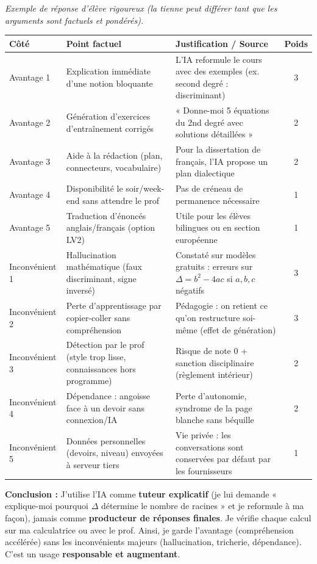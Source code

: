 \documentclass[11pt]{article}
\begin{document}
\begin{corrige}
\textit{Exemple de réponse d'élève rigoureux (la tienne peut différer tant que les arguments sont factuels et pondérés).}
\begin{center}
\begin{tabularx}{\linewidth}{|l|X|X|c|}
\hline
\textbf{Côté} & \textbf{Point factuel} & \textbf{Justification / Source} & \textbf{Poids} \\
\hline
Avantage 1 & Explication immédiate d'une notion bloquante & L'IA reformule le cours avec des exemples (ex. second degré : discriminant) & 3 \\
Avantage 2 & Génération d'exercices d'entraînement corrigés & « Donne-moi 5 équations du 2nd degré avec solutions détaillées » & 2 \\
Avantage 3 & Aide à la rédaction (plan, connecteurs, vocabulaire) & Pour la dissertation de français, l'IA propose un plan dialectique & 2 \\
Avantage 4 & Disponibilité le soir/week-end sans attendre le prof & Pas de créneau de permanence nécessaire & 1 \\
Avantage 5 & Traduction d'énoncés anglais/français (option LV2) & Utile pour les élèves bilingues ou en section européenne & 1 \\
\hline
Inconvénient 1 & Hallucination mathématique (faux discriminant, signe inversé) & Constaté sur modèles gratuits : erreurs sur $\Delta = b^2-4ac$ si $a,b,c$ négatifs & 3 \\
Inconvénient 2 & Perte d'apprentissage par copier-coller sans compréhension & Pédagogie : on retient ce qu'on restructure soi-même (effet de génération) & 3 \\
Inconvénient 3 & Détection par le prof (style trop lisse, connaissances hors programme) & Risque de note 0 + sanction disciplinaire (règlement intérieur) & 2 \\
Inconvénient 4 & Dépendance : angoisse face à un devoir sans connexion/IA & Perte d'autonomie, syndrome de la page blanche sans béquille & 2 \\
Inconvénient 5 & Données personnelles (devoirs, niveau) envoyées à serveur tiers & Vie privée : les conversations sont conservées par défaut par les fournisseurs & 1 \\
\hline
\end{tabularx}
\end{center}
\textbf{Conclusion :} J'utilise l'IA comme \textbf{tuteur explicatif} (je lui demande « explique-moi pourquoi $\Delta$ détermine le nombre de racines » et je reformule à ma façon), jamais comme \textbf{producteur de réponses finales}. Je vérifie chaque calcul sur ma calculatrice ou avec le prof. Ainsi, je garde l'avantage (compréhension accélérée) sans les inconvénients majeurs (hallucination, tricherie, dépendance). C'est un usage \textbf{responsable et augmentant}.
\end{corrige}
\end{document}
